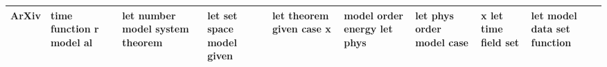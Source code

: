 \documentclass[11pt,a4paper]{article}
\begin{document}
\begin{appendices}
\begin{table}[htb]
\begin{tiny}
\begin{tabular}{|p{}|p{}|p{}|p{}|p{}|p{}|p{}|p{}|p{}|}
    ArXiv & time \newline function \newline r \newline model \newline al & let \newline number \newline model \newline system \newline theorem & let \newline set \newline space \newline model \newline given & let \newline theorem \newline given \newline case \newline x & model \newline order \newline energy \newline let \newline phys & let \newline phys \newline order \newline model \newline case & x \newline let \newline time \newline field \newline set & let \newline model \newline data \newline set \newline function\\\hline

\end{tabular}
\end{tiny}
\end{table}
\end{appendices}
\end{document}
